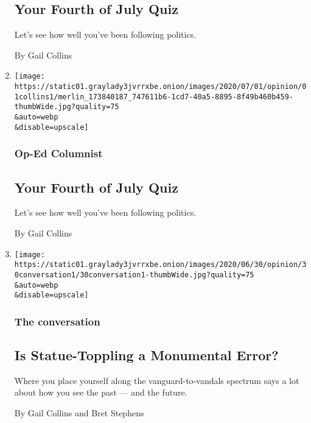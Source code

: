 \begin{enumerate}
  \hypertarget{your-fourth-of-july-quiz}{%
  \subsection{Your Fourth of July Quiz}\label{your-fourth-of-july-quiz}}

  Let's see how well you've been following politics.

  By Gail Collins
\item
  \href{/interactive/2020/07/01/opinion/4th-of-july-quiz.html}{}

  \texttt{[image: https://static01.graylady3jvrrxbe.onion/images/2020/07/01/opinion/01collins1/merlin\_173840187\_747611b6-1cd7-40a5-8895-8f49b460b459-thumbWide.jpg?quality=75\\\&auto=webp\\\&disable=upscale]}

  \hypertarget{op-ed-columnist-1}{%
  \subsubsection{Op-Ed Columnist}\label{op-ed-columnist-1}}

  \hypertarget{your-fourth-of-july-quiz-1}{%
  \subsection{Your Fourth of July
  Quiz}\label{your-fourth-of-july-quiz-1}}

  Let's see how well you've been following politics.

  By Gail Collins
\item
  \href{/2020/06/30/opinion/statues-protesters-jefferson-jackson.html}{}

  \texttt{[image: https://static01.graylady3jvrrxbe.onion/images/2020/06/30/opinion/30conversation1/30conversation1-thumbWide.jpg?quality=75\\\&auto=webp\\\&disable=upscale]}

  \hypertarget{the-conversation-4}{%
  \subsubsection{The conversation}\label{the-conversation-4}}

  \hypertarget{is-statue-toppling-a-monumental-error}{%
  \subsection{Is Statue-Toppling a Monumental
  Error?}\label{is-statue-toppling-a-monumental-error}}

  Where you place yourself along the vanguard-to-vandals spectrum says a
  lot about how you see the past --- and the future.

  By Gail Collins and Bret Stephens
\end{enumerate}

